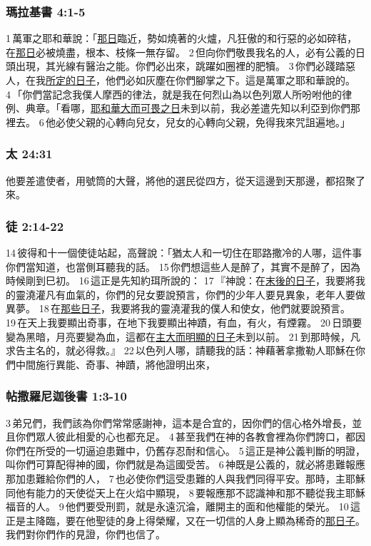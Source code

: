 \subsubsection{瑪拉基書 4:1-5}
1 萬軍之耶和華說：「\underline{那日}臨近，勢如燒著的火爐，凡狂傲的和行惡的必如碎秸，在\underline{那日}必被燒盡，根本、枝條一無存留。 2 但向你們敬畏我名的人，必有公義的日頭出現，其光線有醫治之能。你們必出來，跳躍如圈裡的肥犢。 3 你們必踐踏惡人，在我\underline{所定的日子}，他們必如灰塵在你們腳掌之下。這是萬軍之耶和華說的。4 「你們當記念我僕人摩西的律法，就是我在何烈山為以色列眾人所吩咐他的律例、典章。「看哪，\underline{耶和華大而可畏之日}未到以前，我必差遣先知以利亞到你們那裡去。 6 他必使父親的心轉向兒女，兒女的心轉向父親，免得我來咒詛遍地。」

\subsubsection{太 24:31}
他要差遣使者，用號筒的大聲，將他的選民從四方，從天這邊到天那邊，都招聚了來。

\subsubsection{徒 2:14-22}
14 彼得和十一個使徒站起，高聲說：「猶太人和一切住在耶路撒冷的人哪，這件事你們當知道，也當側耳聽我的話。 15 你們想這些人是醉了，其實不是醉了，因為時候剛到巳初。 16 這正是先知約珥所說的： 17 『神說：在\underline{末後的日子}，我要將我的靈澆灌凡有血氣的，你們的兒女要說預言，你們的少年人要見異象，老年人要做異夢。 18 在\underline{那些日子}，我要將我的靈澆灌我的僕人和使女，他們就要說預言。 19 在天上我要顯出奇事，在地下我要顯出神蹟，有血，有火，有煙霧。 20 日頭要變為黑暗，月亮要變為血，這都在\underline{主大而明顯的日子}未到以前。 21 到那時候，凡求告主名的，就必得救。』 22 以色列人哪，請聽我的話：神藉著拿撒勒人耶穌在你們中間施行異能、奇事、神蹟，將他證明出來，


\subsubsection{帖撒羅尼迦後書 1:3-10}
3 弟兄們，我們該為你們常常感謝神，這本是合宜的，因你們的信心格外增長，並且你們眾人彼此相愛的心也都充足。 4 甚至我們在神的各教會裡為你們誇口，都因你們在所受的一切逼迫患難中，仍舊存忍耐和信心。 5 這正是神公義判斷的明證，叫你們可算配得神的國，你們就是為這國受苦。 6 神既是公義的，就必將患難報應那加患難給你們的人， 7 也必使你們這受患難的人與我們同得平安。那時，主耶穌同他有能力的天使從天上在火焰中顯現， 8 要報應那不認識神和那不聽從我主耶穌福音的人。 9 他們要受刑罰，就是永遠沉淪，離開主的面和他權能的榮光。 10 這正是主降臨，要在他聖徒的身上得榮耀，又在一切信的人身上顯為稀奇的\underline{那日子}。我們對你們作的見證，你們也信了。



